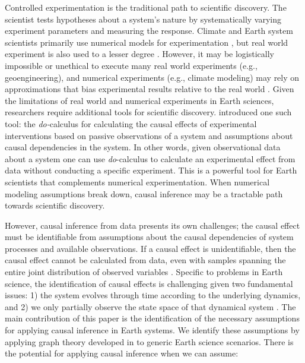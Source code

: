 \documentclass[12pt]{article}
\begin{document}
Controlled experimentation is the traditional path to scientific
discovery. The scientist tests hypotheses about a system's nature by
systematically varying experiment parameters and measuring the
response. Climate and Earth system scientists primarily use numerical
models for experimentation \citep[e.g.,][]{eyring-cmip6-2016}, but
real world experiment is also used to a lesser degree
\citep[e.g.,][]{ainsworth-face-2005}. However, it may be logistically
impossible or unethical to execute many real world experiments (e.g.,
geoengineering), and numerical experiments (e.g., climate modeling)
may rely on approximations that bias experimental results relative to
the real world
\citep[e.g.,][]{kim-cmip5,stillmann-cmip5-extremes}. Given the
limitations of real world and numerical experiments in Earth sciences,
researchers require additional tools for scientific discovery.
\citet{pearl-1994-do-calculus} introduced one such tool: the
\textit{do-}calculus for calculating the causal effects of
experimental interventions based on passive observations of a system
and assumptions about causal dependencies in the system. In other
words, given observational data about a system one can use
\textit{do}-calculus to calculate an experimental effect from data
without conducting a specific experiment. This is a powerful tool for
Earth scientists that complements numerical experimentation. When
numerical modeling assumptions break down, causal inference may be a
tractable path towards scientific discovery.

However, causal inference from data presents its own challenges; the
causal effect must be identifiable from assumptions about the causal
dependencies of system processes and available observations. If a
causal effect is unidentifiable, then the causal effect cannot be
calculated from data, even with samples spanning the entire joint
distribution of observed variables \citep[][]{shpitser2006}. Specific
to problems in Earth science, the identification of causal effects is
challenging given two fundamental issues: 1) the system evolves
through time according to the underlying dynamics, and 2) we only
partially observe the state space of that dynamical system
\citep{majda-state}. The main contribution of this paper is the
identification of the necessary assumptions for applying causal
inference in Earth systems. We identify these assumptions by applying
graph theory developed in \citet{pearl1995causal} to generic Earth
science scenarios. There is the potential for applying causal
inference when we can assume:
\end{document}
